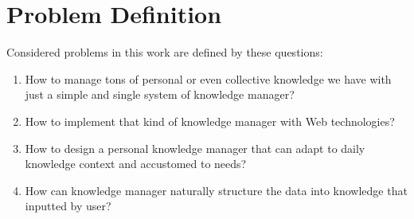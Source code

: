 \section{Problem Definition}
\label{sec:problem-definition}

Considered problems in this work are defined by these questions:

\begin{enumerate}
\item How to manage tons of personal or even collective knowledge we have with just a simple and single system of knowledge manager?
\item How to implement that kind of knowledge manager with Web technologies?
\item How to design a personal knowledge manager that can adapt to daily knowledge context and accustomed to needs?
\item How can knowledge manager naturally structure the data into knowledge that inputted by user?
\end{enumerate}

